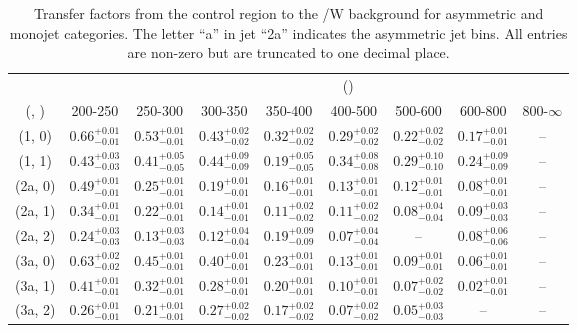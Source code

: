 \begin{table}[h!]
\tiny
\centering
\caption{Transfer factors from the \mj control region to the \ttbar/W background for asymmetric and monojet categories. The letter ``a'' in jet \eg ``2a''  indicates the asymmetric jet bins. All entries are non-zero but are truncated to one decimal place.\label{tab:tf_mu_ttw_asym}}
\begin{tabular}
{ccccccccc}
	\hline\hline
&	& \multicolumn{8}{c}{\scalht (\gev)} \\ 
	 (\njet,  \nb) & 200-250 & 250-300 & 300-350 & 350-400 & 400-500 & 500-600 & 600-800 & 800-$\infty$ \\ [0.8ex] 
\hline
	(1, 0) & $0.66^{+ 0.01 }_{- 0.01 }$ & $0.53^{+ 0.01 }_{- 0.01 }$ & $0.43^{+ 0.02 }_{- 0.02 }$ & $0.32^{+ 0.02 }_{- 0.02 }$ & $0.29^{+ 0.02 }_{- 0.02 }$ & $0.22^{+ 0.02 }_{- 0.02 }$ & $0.17^{+ 0.01 }_{- 0.01 }$ & -- \\[0.5ex] 
	(1, 1) & $0.43^{+ 0.03 }_{- 0.03 }$ & $0.41^{+ 0.05 }_{- 0.05 }$ & $0.44^{+ 0.09 }_{- 0.09 }$ & $0.19^{+ 0.05 }_{- 0.05 }$ & $0.34^{+ 0.08 }_{- 0.08 }$ & $0.29^{+ 0.10 }_{- 0.10 }$ & $0.24^{+ 0.09 }_{- 0.09 }$ & -- \\[0.5ex] 
	(2a, 0) & $0.49^{+ 0.01 }_{- 0.01 }$ & $0.25^{+ 0.01 }_{- 0.01 }$ & $0.19^{+ 0.01 }_{- 0.01 }$ & $0.16^{+ 0.01 }_{- 0.01 }$ & $0.13^{+ 0.01 }_{- 0.01 }$ & $0.12^{+ 0.01 }_{- 0.01 }$ & $0.08^{+ 0.01 }_{- 0.01 }$ & -- \\[0.5ex] 
	(2a, 1) & $0.34^{+ 0.01 }_{- 0.01 }$ & $0.22^{+ 0.01 }_{- 0.01 }$ & $0.14^{+ 0.01 }_{- 0.01 }$ & $0.11^{+ 0.02 }_{- 0.02 }$ & $0.11^{+ 0.02 }_{- 0.02 }$ & $0.08^{+ 0.04 }_{- 0.04 }$ & $0.09^{+ 0.03 }_{- 0.03 }$ & -- \\[0.5ex] 
	(2a, 2) & $0.24^{+ 0.03 }_{- 0.03 }$ & $0.13^{+ 0.03 }_{- 0.03 }$ & $0.12^{+ 0.04 }_{- 0.04 }$ & $0.19^{+ 0.09 }_{- 0.09 }$ & $0.07^{+ 0.04 }_{- 0.04 }$ & -- & $0.08^{+ 0.06 }_{- 0.06 }$ & -- \\[0.5ex] 
	(3a, 0) & $0.63^{+ 0.02 }_{- 0.02 }$ & $0.45^{+ 0.01 }_{- 0.01 }$ & $0.40^{+ 0.01 }_{- 0.01 }$ & $0.23^{+ 0.01 }_{- 0.01 }$ & $0.13^{+ 0.01 }_{- 0.01 }$ & $0.09^{+ 0.01 }_{- 0.01 }$ & $0.06^{+ 0.01 }_{- 0.01 }$ & -- \\[0.5ex] 
	(3a, 1) & $0.41^{+ 0.01 }_{- 0.01 }$ & $0.32^{+ 0.01 }_{- 0.01 }$ & $0.28^{+ 0.01 }_{- 0.01 }$ & $0.20^{+ 0.01 }_{- 0.01 }$ & $0.10^{+ 0.01 }_{- 0.01 }$ & $0.07^{+ 0.02 }_{- 0.02 }$ & $0.02^{+ 0.01 }_{- 0.01 }$ & -- \\[0.5ex] 
	(3a, 2) & $0.26^{+ 0.01 }_{- 0.01 }$ & $0.21^{+ 0.01 }_{- 0.01 }$ & $0.27^{+ 0.02 }_{- 0.02 }$ & $0.17^{+ 0.02 }_{- 0.02 }$ & $0.07^{+ 0.02 }_{- 0.02 }$ & $0.05^{+ 0.03 }_{- 0.03 }$ & -- & -- \\[0.5ex] 

\end{tabular}
\end{table}
